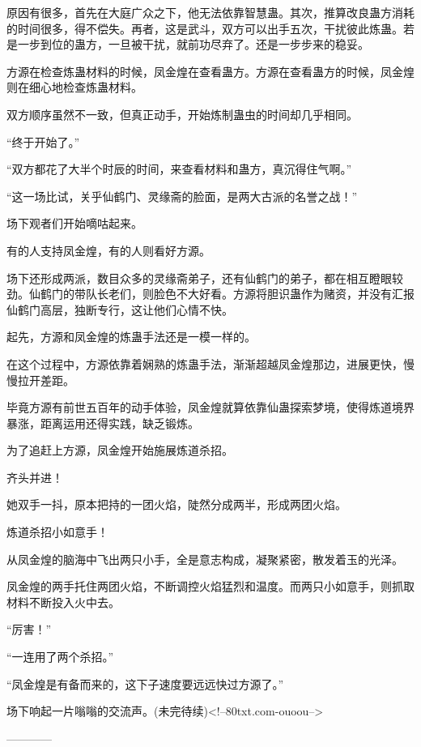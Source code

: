 \begin{this_body}
原因有很多，首先在大庭广众之下，他无法依靠智慧蛊。其次，推算改良蛊方消耗的时间很多，得不偿失。再者，这是武斗，双方可以出手五次，干扰彼此炼蛊。若是一步到位的蛊方，一旦被干扰，就前功尽弃了。还是一步步来的稳妥。

方源在检查炼蛊材料的时候，凤金煌在查看蛊方。方源在查看蛊方的时候，凤金煌则在细心地检查炼蛊材料。

双方顺序虽然不一致，但真正动手，开始炼制蛊虫的时间却几乎相同。

“终于开始了。”

“双方都花了大半个时辰的时间，来查看材料和蛊方，真沉得住气啊。”

“这一场比试，关乎仙鹤门、灵缘斋的脸面，是两大古派的名誉之战！”

场下观者们开始嘀咕起来。

有的人支持凤金煌，有的人则看好方源。

场下还形成两派，数目众多的灵缘斋弟子，还有仙鹤门的弟子，都在相互瞪眼较劲。仙鹤门的带队长老们，则脸色不大好看。方源将胆识蛊作为赌资，并没有汇报仙鹤门高层，独断专行，这让他们心情不快。

起先，方源和凤金煌的炼蛊手法还是一模一样的。

在这个过程中，方源依靠着娴熟的炼蛊手法，渐渐超越凤金煌那边，进展更快，慢慢拉开差距。

毕竟方源有前世五百年的动手体验，凤金煌就算依靠仙蛊探索梦境，使得炼道境界暴涨，距离运用还得实践，缺乏锻炼。

为了追赶上方源，凤金煌开始施展炼道杀招。

齐头并进！

她双手一抖，原本把持的一团火焰，陡然分成两半，形成两团火焰。

炼道杀招小如意手！

从凤金煌的脑海中飞出两只小手，全是意志构成，凝聚紧密，散发着玉的光泽。

凤金煌的两手托住两团火焰，不断调控火焰猛烈和温度。而两只小如意手，则抓取材料不断投入火中去。

“厉害！”

“一连用了两个杀招。”

“凤金煌是有备而来的，这下子速度要远远快过方源了。”

场下响起一片嗡嗡的交流声。(未完待续)<!--80txt.com-ouoou-->

------------

\end{this_body}

